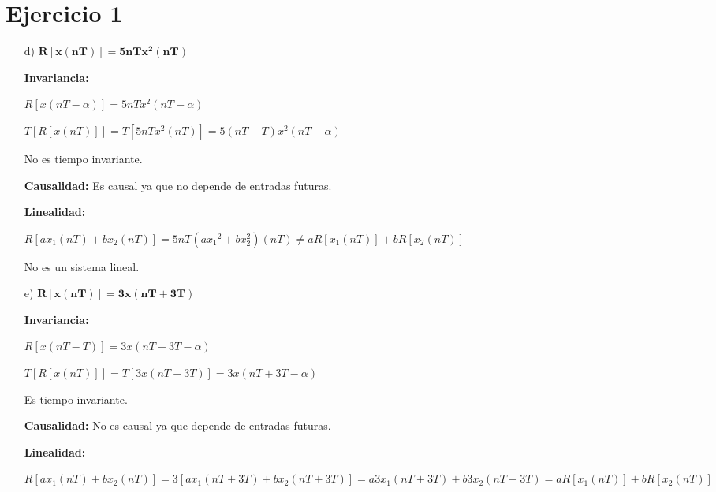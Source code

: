 








\section*{Ejercicio 1}
\begin{itemize}
	\item[d)] $\mathbf{R \left[ x \left( nT \right) \right] = 5nT x^2 \left( nT \right)}$ 
	
		\textbf{Invariancia:}
		
		$R \left[ x \left( nT - \alpha \right) \right] = 5nT x^2 \left( nT - \alpha \right)$ 
		
		$T \left[ R \left[ x \left( nT \right) \right] \right] = T \left[ 5nT x^2 \left( nT \right) \right] = 5(nT-T) x^2 \left( nT - \alpha \right)$ 
		
		No es tiempo invariante.
		
		\textbf{Causalidad:} Es causal ya que no depende de entradas futuras.
		
		\textbf{Linealidad:}
		
		 $R \left[ ax_1 \left( nT \right) + bx_2 \left( nT \right) \right] = 5nT \left(a{x_{1}}^{2} + b {x_{2}^{2}}\right) \left( nT \right) \neq aR \left[ x_1 \left( nT \right) \right] + bR \left[ x_2 \left( nT \right) \right]$

		No es un sistema lineal.
		
	\item[e)] $\mathbf{R \left[ x \left( nT \right) \right] = 3x \left( nT + 3T\right)}$ 
	
		\textbf{Invariancia:}
		
		$R \left[ x \left( nT - T \right) \right] = 3x \left( nT + 3T - \alpha \right)$ 
		
		$T \left[ R \left[ x \left( nT \right) \right] \right] = T \left[ 3x \left( nT + 3T \right) \right] = 3x \left( nT + 3T - \alpha \right)$ 
		
		Es tiempo invariante.
		
		\textbf{Causalidad:} No es causal ya que depende de entradas futuras.
		
		\textbf{Linealidad:}
		
		 $R \left[ ax_1 \left( nT \right) + bx_2 \left( nT \right) \right] = 3 \left[ ax_{1} \left( nT + 3T \right) + b x_{2} \left( nT + 3T \right) \right] = a 3 x_{1} \left( nT + 3T \right) + b 3x_{2} \left( nT + 3T \right) = aR \left[ x_1 \left( nT \right) \right] + bR \left[ x_2 \left( nT \right) \right]$


\end{itemize}

